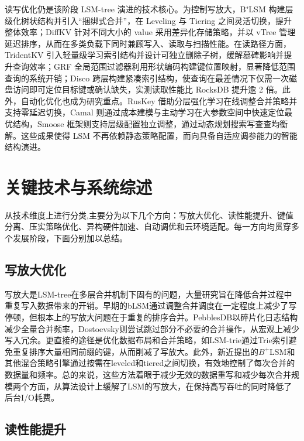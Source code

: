 \documentclass[lang=cn,11pt,a4paper]{elegantpaper}
\begin{document}
读写优化仍是该阶段 LSM-tree 演进的技术核心。为控制写放大，B⁺LSM 构建层级化树状结构并引入“捆绑式合并”，在 Leveling 与 Tiering 之间灵活切换，提升整体效率；DiffKV 针对不同大小的 value 采用差异化存储策略，并以 vTree 管理延迟排序，从而在多类负载下同时兼顾写入、读取与扫描性能。在读路径方面，TridentKV 引入轻量级学习索引结构并设计可独立删除子树，缓解墓碑影响并提升查询效率；GRF 全局范围过滤器利用形状编码构建键位置映射，显著降低范围查询的系统开销；Disco 跨层构建紧凑索引结构，使查询在最差情况下仅需一次磁盘访问即可定位目标键或确认缺失，实测读取性能比 RocksDB 提升逾 2 倍。此外，自动化优化也成为研究重点。RusKey 借助分层强化学习在线调整合并策略并支持零延迟切换，Camal 则通过成本建模与主动学习在大参数空间中快速定位最优结构，Smoose 框架则支持层级配置独立调整，通过动态规划搜索写查查均衡解。这些成果使得 LSM 不再依赖静态策略配置，而向具备自适应调参能力的智能结构演进。




\section{关键技术与系统综述}

从技术维度上进行分类,主要分为以下几个方向：写放大优化、读性能提升、键值分离、压实策略优化、异构硬件加速、自动调优和云环境适配。每一方向均贯穿多个发展阶段，下面分别加以总结。


\subsection{写放大优化}
写放大是LSM-tree在多层合并机制下固有的问题，大量研究旨在降低合并过程中重复写入数据带来的开销。早期的bLSM通过调整合并调度在一定程度上减少了写停顿，但根本上的写放大问题在于重复的排序合并。PebblesDB以碎片化日志结构减少全量合并频率，Dostoevsky则尝试跳过部分不必要的合并操作，从宏观上减少写入冗余。更直接的途径是优化数据布局和合并策略，如LSM-trie通过Trie索引避免重复排序大量相同前缀的键，从而削减了写放大。此外，新近提出的$B^+$LSM和其他混合策略引擎通过按需在leveled和tiered之间切换，有效地控制了每次合并的数据量和频率。总的来说，这些方法着眼于减少无效的数据重写和减少每次合并规模两个方面，从算法设计上缓解了LSM的写放大，在保持高写吞吐的同时降低了后台I/O耗费。
\subsection{读性能提升}
\end{document}
